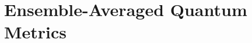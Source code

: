 \documentclass[11pt,a4paper]{article}
\begin{document}

\section{Ensemble-Averaged Quantum Metrics}
\label{sec:S7}








\end{document}

